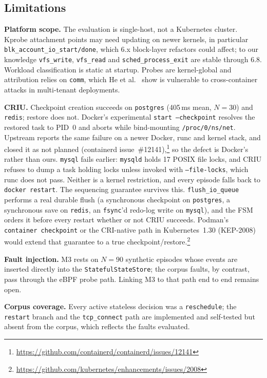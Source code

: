 \documentclass[conference]{IEEEtran}
\begin{document}
\subsection{Limitations}
\label{sec:limitations}

\textbf{Platform scope.} The evaluation is single-host, not a Kubernetes cluster. Kprobe attachment points may need updating on newer kernels, in particular \texttt{blk\_account\_io\_start/done}, which 6.x block-layer refactors could affect; to our knowledge \texttt{vfs\_write}, \texttt{vfs\_read} and \texttt{sched\_process\_exit} are stable through 6.8. Workload classification is static at startup. Probes are kernel-global and attribution relies on \texttt{comm}, which He et al.~\cite{b16} show is vulnerable to cross-container attacks in multi-tenant deployments.

\textbf{CRIU.} Checkpoint creation succeeds on \texttt{postgres} (405\,ms mean, $N=30$) and \texttt{redis}; restore does not. Docker's experimental \texttt{start~--checkpoint} resolves the restored task to PID~0 and aborts while bind-mounting \texttt{/proc/0/ns/net}. Upstream reports the same failure on a newer Docker, runc and kernel stack, and closed it as not planned (containerd issue~\#12141),\footnote{\url{https://github.com/containerd/containerd/issues/12141}} so the defect is Docker's rather than ours. \texttt{mysql} fails earlier: \texttt{mysqld} holds 17 POSIX file locks, and CRIU refuses to dump a task holding locks unless invoked with \texttt{--file-locks}, which runc does not pass. Neither is a kernel restriction, and every episode falls back to \texttt{docker restart}. The sequencing guarantee survives this. \texttt{flush\_io\_queue} performs a real durable flush (a synchronous checkpoint on \texttt{postgres}, a synchronous save on \texttt{redis}, an \texttt{fsync}'d redo-log write on \texttt{mysql}), and the FSM orders it before every restart whether or not CRIU succeeds. Podman's \texttt{container checkpoint} or the CRI-native path in Kubernetes~1.30 (KEP-2008) would extend that guarantee to a true checkpoint/restore.\footnote{\url{https://github.com/kubernetes/enhancements/issues/2008}}

\textbf{Fault injection.} M3 rests on $N = 90$ synthetic episodes whose events are inserted directly into the \texttt{StatefulStateStore}; the corpus faults, by contrast, pass through the eBPF probe path. Linking M3 to that path end to end remains open.

\textbf{Corpus coverage.} Every active stateless decision was a \texttt{reschedule}; the \texttt{restart} branch and the \texttt{tcp\_connect} path are implemented and self-tested but absent from the corpus, which reflects the faults evaluated.
\end{document}
